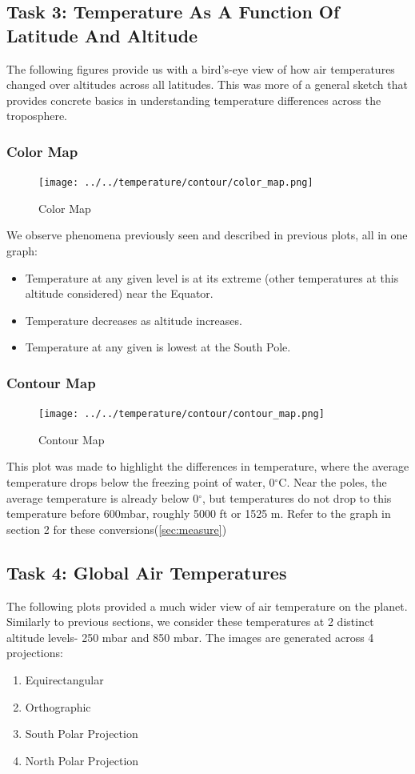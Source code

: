 \documentclass[hidelinks]{article}
\begin{document}
\subsection{Task 3: Temperature As A Function Of Latitude And Altitude}
The following figures provide us with a bird's-eye view of how air temperatures changed over altitudes across all latitudes. This was more of a general sketch that provides concrete basics in understanding temperature differences across the troposphere.
\subsubsection{Color Map}
\begin{figure}[h!]
	\centering
	\texttt{[image: ../../temperature/contour/color\_map.png]}
	\caption{Color Map}
\end{figure}
We observe phenomena previously seen and described in previous plots, all in one graph:
\begin{itemize}
	\item Temperature at any given level is at its extreme (other temperatures at this altitude considered) near the Equator.
	\item Temperature decreases as altitude increases.
	\item Temperature at any given is lowest at the South Pole.
\end{itemize}
\subsubsection{Contour Map}
\begin{figure}[h!]
	\centering
	\texttt{[image: ../../temperature/contour/contour\_map.png]}
	\caption{Contour Map}
\end{figure}
This plot was made to highlight the differences in temperature, where the average temperature drops below the freezing point of water, 0$^\circ$C. Near the poles, the average temperature is already below 0$^\circ$, but temperatures do not drop to this temperature before 600mbar, roughly 5000 ft or 1525 m. Refer to the graph in section 2 for these conversions(\ref{sec:measure}) 

\subsection{Task 4: Global Air Temperatures}
The following plots provided a much wider view of air temperature on the planet. Similarly to previous sections, we consider these temperatures at 2 distinct altitude levels- 250 mbar and 850 mbar. The images are generated across 4 projections:
\begin{enumerate}
	\item Equirectangular
	\item Orthographic
	\item South Polar Projection
	\item North Polar Projection
\end{enumerate}
\end{document}
